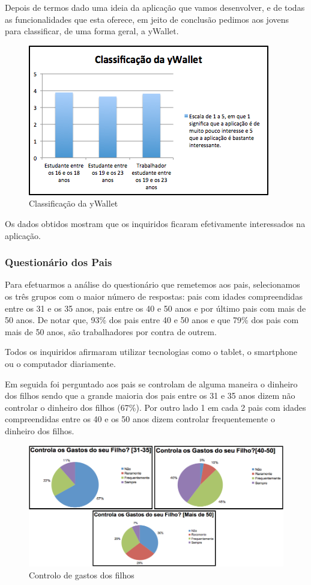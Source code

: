 \documentclass[12pt,a4paper]{article}
\begin{document}
      Depois de termos dado uma ideia da aplicação que vamos desenvolver, e de todas as funcionalidades que esta oferece, em jeito de conclusão pedimos aos jovens para classificar, de uma forma geral, a yWallet.

      \begin{figure}[ht!]
        \centering
          \includegraphics[width=0.7\linewidth]{img/img7}
          \caption{Classificação da yWallet}
          \label{img7}
      \end{figure} 
     
      Os dados obtidos mostram que os inquiridos ficaram efetivamente interessados na aplicação.

    \subsubsection{Questionário dos Pais}

      Para efetuarmos a análise do questionário que remetemos aos pais, selecionamos os três grupos com o maior número de respostas: pais com idades compreendidas entre os 31 e os 35 anos, pais entre os 40 e 50 anos e por último pais com mais de 50 anos. De notar que, 93\% dos pais entre 40 e 50 anos e que 79\% dos pais com mais de 50 anos, são trabalhadores por contra de outrem.

      Todos os inquiridos afirmaram utilizar tecnologias como o tablet, o smartphone ou o computador diariamente.

      Em seguida foi perguntado aos pais se controlam de alguma maneira o dinheiro dos filhos sendo que a grande maioria dos pais entre os 31 e 35 anos dizem não controlar o dinheiro dos filhos (67\%). Por outro lado 1 em cada 2 pais com idades compreendidas entre os 40 e os 50 anos dizem controlar frequentemente o dinheiro dos filhos.

      \begin{figure}[ht!]
        \centering
          \includegraphics[width=0.7\linewidth]{img/img8}
          \caption{Controlo de gastos dos filhos}
          \label{img8}
      \end{figure}       
\end{document}
